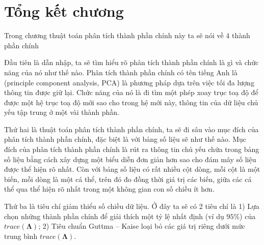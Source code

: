 \documentclass[../thesis.tex]{subfiles}
\begin{document}
\newpage
\section*{Tổng kết chương}

Trong chương thuật toán phân tích thành phần chính này ta sẽ nói về 4 thành phần chính

Đầu tiên là dẫn nhập, ta sẽ tìm hiểu rõ phân tích thành phần chính là gì và chức năng của nó như thế nào. Phân tích thành phần chính có tên tiếng Anh là (principle component analysis, PCA) là phương pháp dựa trên việc tối đa
lượng thông tin được giữ lại. Chức năng của nó là đi tìm một phép xoay trục toạ độ để được một hệ trục toạ độ mới sao cho trong hệ mới này, thông tin của dữ liệu chủ yếu tập trung ở một vài thành phần. 

Thứ hai là thuật toán phân tích thành phần chính, ta sẽ đi sâu vào mục đích của phân tích thành phần chính, đặc biệt là với bảng số liệu sẽ như thế nào. Mục đích của phân tích thành phần chính là rút ra thông tin chủ yếu chứa trong bảng số liệu bằng cách xây dựng một biểu diễn đơn giản hơn sao cho đám mây số liệu được thể hiện rõ nhất. Còn với bảng số liệu có rất nhiều cột dòng, mỗi cột là một biến, mỗi dòng là một cá thể, trên đó đo đồng thời giá trị các biến, giữa các cá thể qua thể hiện rõ nhất trong một không gian con số chiều ít hơn.

Thứ ba là tiêu chí giảm thiểu số chiều dữ liệu. Ở đây ta sẽ có 2 tiêu chí là 1) Lựa chọn những thành phần chính để giải thích một tỷ lệ nhất định (ví dụ $ 95\% $) của $ trace(\bm{\Lambda}) $; 2)  Tiêu chuẩn Guttma – Kaise loại bỏ các giá trị riêng dưới mức trung bình $ trace(\bm{\Lambda}) $.
\end{document}
